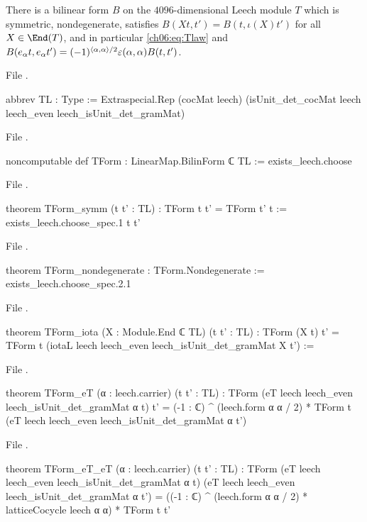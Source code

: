 \begin{theorem}\label{ch06:thm:TForm}
There is a bilinear form $B$ on the $4096$-dimensional Leech module $T$ which is symmetric,
nondegenerate, satisfies $B(Xt,t')=B(t,\iota(X)t')$ for all $X\in\End(T)$, and in particular
\eqref{ch06:eq:Tlaw} and $B(e_\alpha t,e_\alpha t')=(-1)^{\langle\alpha,\alpha\rangle/2}
\varepsilon(\alpha,\alpha)B(t,t')$.
\end{theorem}
\noindent File .
\begin{leancode}
abbrev TL : Type :=
  Extraspecial.Rep (cocMat leech) (isUnit_det_cocMat leech leech_even leech_isUnit_det_gramMat)
\end{leancode}
\noindent File .
\begin{leancode}
noncomputable def TForm : LinearMap.BilinForm ℂ TL := exists_leech.choose
\end{leancode}
\noindent File .
\begin{leancode}
theorem TForm_symm (t t' : TL) : TForm t t' = TForm t' t := exists_leech.choose_spec.1 t t'
\end{leancode}
\noindent File .
\begin{leancode}
theorem TForm_nondegenerate : TForm.Nondegenerate := exists_leech.choose_spec.2.1
\end{leancode}
\noindent File .
\begin{leancode}
theorem TForm_iota (X : Module.End ℂ TL) (t t' : TL) :
    TForm (X t) t' = TForm t (iotaL leech leech_even leech_isUnit_det_gramMat X t') :=
\end{leancode}
\noindent File .
\begin{leancode}
theorem TForm_eT (α : leech.carrier) (t t' : TL) :
    TForm (eT leech leech_even leech_isUnit_det_gramMat α t) t'
      = (-1 : ℂ) ^ (leech.form α α / 2) *
        TForm t (eT leech leech_even leech_isUnit_det_gramMat α t')
\end{leancode}
\noindent File .
\begin{leancode}
theorem TForm_eT_eT (α : leech.carrier) (t t' : TL) :
    TForm (eT leech leech_even leech_isUnit_det_gramMat α t)
        (eT leech leech_even leech_isUnit_det_gramMat α t')
      = ((-1 : ℂ) ^ (leech.form α α / 2) * latticeCocycle leech α α) * TForm t t'
\end{leancode}
